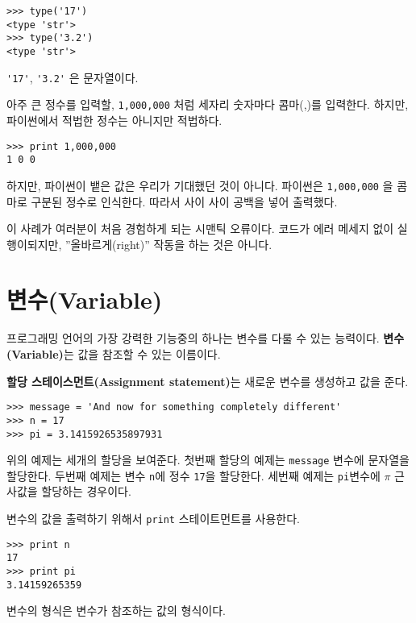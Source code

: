 
\beforeverb
\begin{verbatim}
>>> type('17')
<type 'str'>
>>> type('3.2')
<type 'str'>
\end{verbatim}
\afterverb
%
\verb"'17'", \verb"'3.2'" 은 문자열이다.

아주 큰 정수를 입력할, {\tt 1,000,000} 처럼 세자리 숫자마다 콤마(,)를 입력한다. 하지만, 파이썬에서 적법한 정수는 아니지만 적법하다.

\beforeverb
\begin{verbatim}
>>> print 1,000,000
1 0 0
\end{verbatim}
\afterverb
%
하지만, 파이썬이 뱉은 값은 우리가 기대했던 것이 아니다. 파이썬은 {\tt 1,000,000} 을 콤마로 구분된 정수로 인식한다. 따라서 사이 사이 공백을 넣어 출력했다.


이 사례가 여러분이 처음 경험하게 되는 시맨틱 오류이다. 코드가 에러 메세지 없이 실행이되지만, ''올바르게(right)'' 작동을 하는 것은 아니다.


\section{변수(Variable)}

프로그래밍 언어의 가장 강력한 기능중의 하나는 변수를 다룰 수 있는 능력이다. {\bf 변수(Variable)}는 값을 참조할 수 있는 이름이다.

{\bf 할당 스테이스먼트(Assignment statement)}는 새로운 변수를 생성하고 값을 준다.

\beforeverb
\begin{verbatim}
>>> message = 'And now for something completely different'
>>> n = 17
>>> pi = 3.1415926535897931
\end{verbatim}
\afterverb
%
위의 예제는 세개의 할당을 보여준다. 첫번째 할당의 예제는 {\tt message} 변수에 문자열을 할당한다. 두번째 예제는 변수 {\tt n}에 정수 {\tt 17}을 할당한다. 세번째 예제는 {\tt pi}변수에 $\pi$ 근사값을 할당하는 경우이다.

변수의 값을 출력하기 위해서 {\tt print} 스테이트먼트를 사용한다.

\beforeverb
\begin{verbatim}
>>> print n
17
>>> print pi
3.14159265359
\end{verbatim}
\afterverb
%

변수의 형식은 변수가 참조하는 값의 형식이다.

